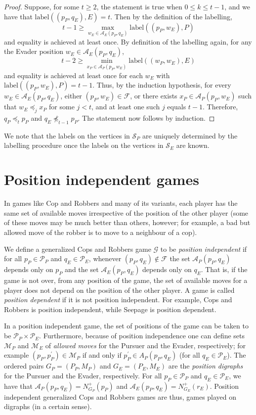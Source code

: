\documentclass[12pt,reqno]{amsart}
\begin{document}
\begin{proof}
Suppose, for some $t \geq 2$, the statement is true when $ 0 \leq k \leq t-1$, and we have that $\mathrm{label}((p_P, q_E), E) = t$. Then by the definition of the labelling,
$$t-1 \geq \max_{w_E \in \mathcal{A}_E(p_P, q_E)}  \mathrm{label}((p_P, w_E) , P)$$
and equality is achieved at least once.
By definition of the labelling again, for any the Evader position $w_E \in \mathcal{A}_E(p_P, q_E)$,
$$t-2 \geq \min_{x_P \in \mathcal{A}_P(p_P, w_E)}  \mathrm{label}((w_P, w_E) , E)$$
and equality is achieved at least once for each $w_E$ with $\mathrm{label}((p_P, w_E) , P) = t-1$. Thus, by the induction hypothesis, for every $w_E \in \mathcal{A}_E(p_P, q_E)$, either $(p_P, w_E)
\in \mathcal{F}$, or there exists $x_P \in \mathcal{A}_P(p_P, w_E)$ such that $w_E \preceq_j x_P$ for some $j < t$, and at least one such $j$ equals $t-1$. Therefore, $q_P \preceq_{t} p_P$ and $q_E
\not\preceq_{t - 1} p_P$.  The statement now follows by induction.
\end{proof}
We note that the labels on the vertices in $\mathcal{S}_P$ are uniquely determined by the labelling procedure once the labels on the vertices in $\mathcal{S}_E$ are known.

\section{Position independent games}\label{pind}

In games like Cop and Robbers and many of its variants, each player has the same set of available moves irrespective of the position of the other player (some of these moves may be much better than
others, however; for example, a bad but allowed move of the robber is to move to a neighbour of a cop).

We define a generalized Cops and Robbers game $\mathcal{G}$ to be \emph{position independent} if for all $p_P \in \mathcal{P}_P$ and $q_E \in \mathcal{P}_E$, whenever $(p_P, q_E) \not\in \mathcal{F}$
the set $\mathcal{A}_P(p_P, q_E)$ depends only on $p_P$ and the set $\mathcal{A}_E(p_P, q_E)$ depends only on $q_E$.  That is, if the game is not over, from any position of the game, the set of
available moves for a player does not depend on the position of the other player. A game is called \emph{position dependent} if it is not position independent.   For example, Cops and Robbers is
position independent, while Seepage is position dependent.

In a position independent game, the set of positions of the game can be taken to be $\mathcal{P}_P \times \mathcal{P}_E$.  Furthermore, because of position independence one can define sets
$\mathcal{M}_P$ and $\mathcal{M}_E$ of \emph{allowed moves} for the Pursuer and the Evader, respectively;  for example $(p_P, p^ \prime_P) \in \mathcal{M}_P$ if and only if $p^\prime_P \in A_P(p_P,
q_E)$ (for all $q_E \in \mathcal{P}_E$).  The ordered pairs $G_P = (P_P, M_P)$ and $G_E = (P_E, M_E)$ are the \emph{position digraphs} for the Pursuer and the Evader, respectively. For all $p_P \in
\mathcal{P}_P$ and $q_E \in \mathcal{P}_E$, we have that $\mathcal{A}_P(p_P, q_E) = N^+_{G_P}(p_P)$ and $\mathcal{A}_E(p_P, q_E) = N^+_{G_E}(r_E)$. Position independent generalized Cops and Robbers
games are thus, games played on digraphs (in a certain sense).
\end{document}
